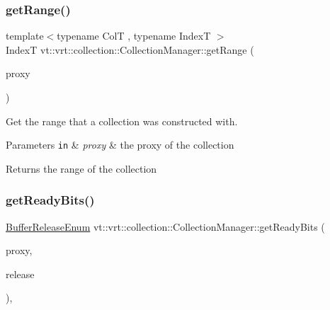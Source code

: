 \subsubsection{\texorpdfstring{get\+Range()}{getRange()}}
{\footnotesize\ttfamily template$<$typename ColT , typename IndexT $>$ \\
IndexT vt\+::vrt\+::collection\+::\+Collection\+Manager\+::get\+Range (\begin{DoxyParamCaption}\item[{\hyperlink{namespacevt_a1b417dd5d684f045bb58a0ede70045ac}{Virtual\+Proxy\+Type}}]{proxy }\end{DoxyParamCaption})}



Get the range that a collection was constructed with. 


\begin{DoxyParams}[1]{Parameters}
\mbox{\tt in}  & {\em proxy} & the proxy of the collection\\
\hline
\end{DoxyParams}
\begin{DoxyReturn}{Returns}
the range of the collection 
\end{DoxyReturn}
\mbox{\label{structvt_1_1vrt_1_1collection_1_1_collection_manager_aa6872852acd04a94e2bff5addad2ad06}} 
\subsubsection{\texorpdfstring{get\+Ready\+Bits()}{getReadyBits()}}
{\footnotesize\ttfamily \hyperlink{namespacevt_1_1vrt_1_1collection_a2545006e681bacc1f00be9d5d6bdc8fa}{Buffer\+Release\+Enum} vt\+::vrt\+::collection\+::\+Collection\+Manager\+::get\+Ready\+Bits (\begin{DoxyParamCaption}\item[{\hyperlink{namespacevt_a1b417dd5d684f045bb58a0ede70045ac}{Virtual\+Proxy\+Type}}]{proxy,  }\item[{\hyperlink{namespacevt_1_1vrt_1_1collection_a2545006e681bacc1f00be9d5d6bdc8fa}{Buffer\+Release\+Enum}}]{release }\end{DoxyParamCaption})\hspace{0.3cm}{\ttfamily [inline]}, {\ttfamily [private]}}



